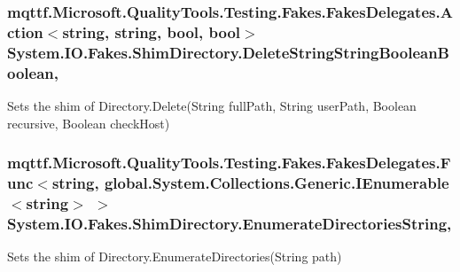 \hypertarget{class_system_1_1_i_o_1_1_fakes_1_1_shim_directory_a55ff2d54614fc2b8f23698c29ff2ac7a}{
\subsubsection[{Delete\-String\-String\-Boolean\-Boolean}]{\setlength{\rightskip}{0pt plus 5cm}mqttf.\-Microsoft.\-Quality\-Tools.\-Testing.\-Fakes.\-Fakes\-Delegates.\-Action$<$string, string, bool, bool$>$ System.\-I\-O.\-Fakes.\-Shim\-Directory.\-Delete\-String\-String\-Boolean\-Boolean\hspace{0.3cm}{\ttfamily [static]}, {\ttfamily [set]}}}\label{class_system_1_1_i_o_1_1_fakes_1_1_shim_directory_a55ff2d54614fc2b8f23698c29ff2ac7a}


Sets the shim of Directory.\-Delete(\-String full\-Path, String user\-Path, Boolean recursive, Boolean check\-Host)

\hypertarget{class_system_1_1_i_o_1_1_fakes_1_1_shim_directory_a7c3f17a9b46c6d5ee6657568e6cea8e4}{
\subsubsection[{Enumerate\-Directories\-String}]{\setlength{\rightskip}{0pt plus 5cm}mqttf.\-Microsoft.\-Quality\-Tools.\-Testing.\-Fakes.\-Fakes\-Delegates.\-Func$<$string, global.\-System.\-Collections.\-Generic.\-I\-Enumerable$<$string$>$ $>$ System.\-I\-O.\-Fakes.\-Shim\-Directory.\-Enumerate\-Directories\-String\hspace{0.3cm}{\ttfamily [static]}, {\ttfamily [set]}}}\label{class_system_1_1_i_o_1_1_fakes_1_1_shim_directory_a7c3f17a9b46c6d5ee6657568e6cea8e4}


Sets the shim of Directory.\-Enumerate\-Directories(\-String path)


